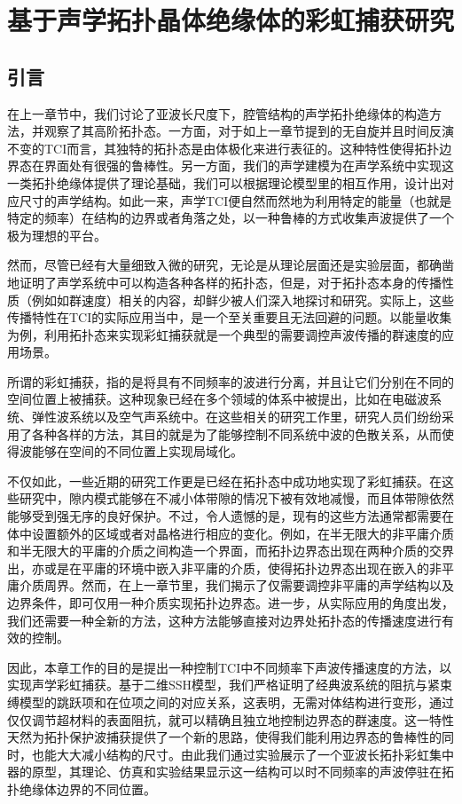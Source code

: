\chapter{基于声学拓扑晶体绝缘体的彩虹捕获研究}
\section{引言}
在上一章节中，我们讨论了亚波长尺度下，腔管结构的声学拓扑绝缘体的构造方法，并观察了其高阶拓扑态。一方面，对于如上一章节提到的无自旋并且时间反演不变的TCI而言，其独特的拓扑态是由体极化来进行表征的。这种特性使得拓扑边界态在界面处有很强的鲁棒性。另一方面，我们的声学建模为在声学系统中实现这一类拓扑绝缘体提供了理论基础，我们可以根据理论模型里的相互作用，设计出对应尺寸的声学结构。如此一来，声学TCI便自然而然地为利用特定的能量（也就是特定的频率）在结构的边界或者角落之处，以一种鲁棒的方式收集声波提供了一个极为理想的平台。

然而，尽管已经有大量细致入微的研究，无论是从理论层面还是实验层面，都确凿地证明了声学系统中可以构造各种各样的拓扑态，但是，对于拓扑态本身的传播性质（例如如群速度）相关的内容，却鲜少被人们深入地探讨和研究。实际上，这些传播特性在TCI的实际应用当中，是一个至关重要且无法回避的问题。以能量收集为例，利用拓扑态来实现彩虹捕获就是一个典型的需要调控声波传播的群速度的应用场景。

所谓的彩虹捕获，指的是将具有不同频率的波进行分离，并且让它们分别在不同的空间位置上被捕获。这种现象已经在多个领域的体系中被提出，比如在电磁波系统\cite{C41-1,C41-2,C41-3,C41-4,C41-5,C41-6,C41-7,C41-8,C41-9}、弹性波系统\cite{C42-1,C42-2,C42-3,C42-4,C42-5,C42-6}以及空气声系统\cite{C43-1,C43-2,C43-3,C43-4}中。在这些相关的研究工作里，研究人员们纷纷采用了各种各样的方法，其目的就是为了能够控制不同系统中波的色散关系，从而使得波能够在空间的不同位置上实现局域化。

不仅如此，一些近期的研究工作更是已经在拓扑态中成功地实现了彩虹捕获\cite{C44-1,C44-2,C44-3,C44-4,C44-5,C44-6}。在这些研究中，隙内模式能够在不减小体带隙的情况下被有效地减慢，而且体带隙依然能够受到强无序的良好保护。不过，令人遗憾的是，现有的这些方法通常都需要在体中设置额外的区域或者对晶格进行相应的变化。例如，在半无限大的非平庸介质和半无限大的平庸的介质之间构造一个界面，而拓扑边界态出现在两种介质的交界出，亦或是在平庸的环境中嵌入非平庸的介质，使得拓扑边界态出现在嵌入的非平庸介质周界。然而，在上一章节里，我们揭示了仅需要调控非平庸的声学结构以及边界条件，即可仅用一种介质实现拓扑边界态。进一步，从实际应用的角度出发，我们还需要一种全新的方法，这种方法能够直接对边界处拓扑态的传播速度进行有效的控制。

因此，本章工作的目的是提出一种控制TCI中不同频率下声波传播速度的方法，以实现声学彩虹捕获。基于二维SSH模型，我们严格证明了经典波系统的阻抗与紧束缚模型的跳跃项和在位项之间的对应关系，这表明，无需对体结构进行变形，通过仅仅调节超材料的表面阻抗，就可以精确且独立地控制边界态的群速度。这一特性天然为拓扑保护波捕获提供了一个新的思路，使得我们能利用边界态的鲁棒性的同时，也能大大减小结构的尺寸。由此我们通过实验展示了一个亚波长拓扑彩虹集中器的原型，其理论、仿真和实验结果显示这一结构可以时不同频率的声波停驻在拓扑绝缘体边界的不同位置。

